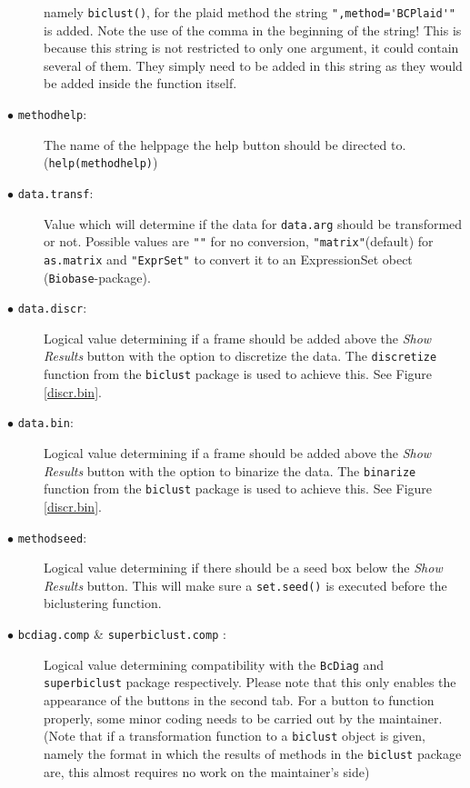 \documentclass[a4paper]{article}\usepackage[]{graphicx}\usepackage[]{color}
\begin{document}
\begin{description}
namely \verb|biclust()|, for the plaid method the string
\verb|",method='BCPlaid'"| is added. Note the use of the comma in the beginning of the string! This is
because this string is not restricted to only one argument, it could contain
several of them. They simply need to be added in this string as they would
be added inside the function itself.  
  \item[$\bullet$ \texttt{methodhelp}:] The name of the helppage the help button
  should be directed to. (\verb|help(methodhelp)|)
  \item[$\bullet$ \texttt{data.transf}:] Value which will determine if the data
  for \verb|data.arg| should be transformed or not. Possible values are
  \verb|""| for no conversion, \verb|"matrix"|(default) for \verb|as.matrix| and
  \verb|"ExprSet"| to convert it to an ExpressionSet obect
  (\texttt{Biobase}-package).
    \item[$\bullet$ \texttt{data.discr}:] Logical value determining if a frame
  should be added above the {\it Show Results} button with the option to
  discretize the data. The \verb|discretize| function from the \verb|biclust|
  package is used to achieve this. See Figure \ref{discr.bin}.
  
  \item[$\bullet$ \texttt{data.bin}:] Logical value determining if a frame
  should be added above the {\it Show Results} button with the option to
  binarize the data. The \verb|binarize| function from the \verb|biclust|
  package is used to achieve this. See Figure \ref{discr.bin}.
  
  \item[$\bullet$ \texttt{methodseed}:] Logical value determining if there
  should be a seed box below the {\it Show Results} button. This will make sure
  a \verb|set.seed()| is executed before the biclustering function.
  
  \item[$\bullet$ \texttt{bcdiag.comp} \& \texttt{superbiclust.comp} :] Logical
  value determining compatibility with the \verb|BcDiag| and \verb|superbiclust|
  package respectively. Please note that this only enables the appearance of the
  buttons in the second tab. For a button to function properly, some minor
  coding needs to be carried out by the maintainer.\\
  (Note that if a transformation function to a \verb|biclust| object is given,
  namely the format in which the results of methods in the \verb|biclust|
  package are, this almost requires no work on the maintainer's side)
  
\end{description}
\end{document}
